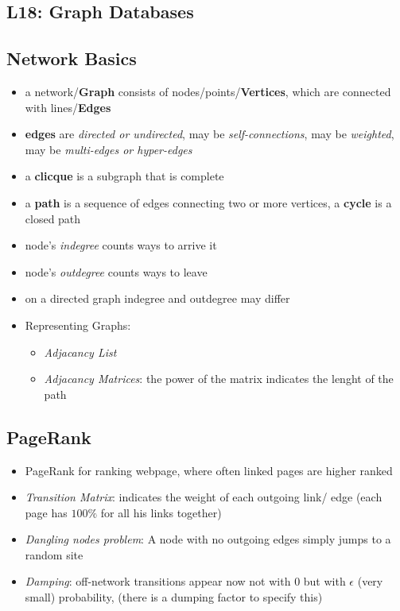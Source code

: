 \documentclass[a4paper]{article}
\begin{document}
\begin{multicols}{3}
\section{L18: Graph Databases}

\subsection{Network Basics}
\begin{itemize}
    \item a network/\textbf{Graph} consists of nodes/points/\textbf{Vertices}, which are connected with lines/\textbf{Edges} 
    \item \textbf{edges} are \textit{directed or undirected}, may be \textit{self-connections}, may be \textit{weighted}, may be \textit{multi-edges or hyper-edges}
    \item a \textbf{clicque} is a subgraph that is complete
    \item a \textbf{path} is a sequence of edges connecting two or more vertices, a \textbf{cycle} is a closed path
    \item node's \textit{indegree} counts ways to arrive it
    \item node's \textit{outdegree} counts ways to leave
    \item on a directed graph indegree and outdegree may differ
    \item Representing Graphs:
        \begin{itemize}
            \item \textit{Adjacancy List}
            \item \textit{Adjacancy Matrices}: the power of the matrix indicates the lenght of the path
        \end{itemize}
\end{itemize}

\subsection{PageRank}
\begin{itemize}
    \item PageRank for ranking webpage, where often linked pages are higher ranked
    \item \textit{Transition Matrix}: indicates the weight of each outgoing link/ edge (each page has $100\%$ for all his links together) 
    \item \textit{Dangling nodes problem}: A node with no outgoing edges simply jumps to a random site
    \item \textit{Damping}: off-network transitions appear now not with $0$ but with $\epsilon$ (very small) probability, (there is a dumping factor to specify this)
\end{itemize}


\end{multicols}
\end{document}
